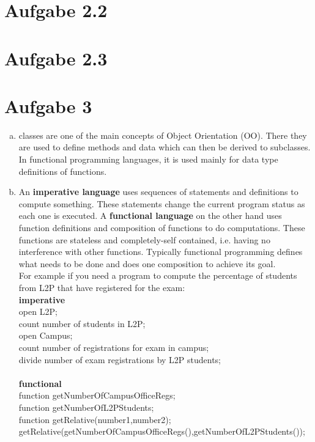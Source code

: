 \documentclass[a4paper,10pt]{scrartcl}[2003/01/01]
\begin{document}
	
	\section*{Aufgabe 2.2}
	
	\section*{Aufgabe 2.3}
	
	\section{Aufgabe 3}
	\begin{enumerate}[a)]
		\item classes are one of the main concepts of Object Orientation (OO). There they are used to define methods and data which can then be derived to subclasses. In functional programming languages, it is used mainly for data type definitions of functions.
		\item An \textbf{imperative language} uses sequences of statements and definitions to compute something. These statements change the current program status as each one is executed. A \textbf{functional language} on the other hand uses function definitions and composition of functions to do computations. These functions are stateless and completely-self contained, i.e. having no interference with other functions. Typically functional programming defines what needs to be done and does one composition to achieve its goal.\\For example if you need a program to compute the percentage of students from L2P that have registered for the exam:\\
		\textbf{imperative}\\
		open L2P;\\
		count number of students in L2P;\\
		open Campus;\\
		count number of registrations for exam in campus;\\
		divide number of exam registrations by L2P students;\\~\\
		\textbf{functional}\\
		function getNumberOfCampusOfficeRegs;\\
		function getNumberOfL2PStudents;\\
		function getRelative(number1,number2);\\
		getRelative(getNumberOfCampusOfficeRegs(),getNumberOfL2PStudents());

\end{enumerate}
\end{document}
